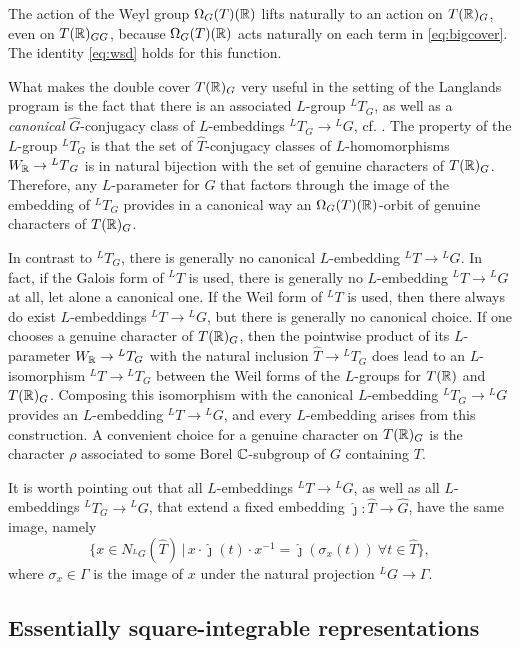 \documentclass{article}
\theoremstyle{definition}
\numberwithin{equation}{section}
\renewcommand{\-}{\hyp{}}
\begin{document}
The action of the Weyl group $\Omega_G(T)(\mathbb{R})$ lifts naturally to an action on $T(\mathbb{R})_G$, even on $T(\mathbb{R})_{GG}$, because $\Omega_G(T)(\mathbb{R})$ acts naturally on each term in \eqref{eq:bigcover}. The identity \eqref{eq:wsd} holds for this function.

What makes the double cover $T(\mathbb{R})_G$ very useful in the setting of the Langlands program is the fact that there is an associated $L$\-group $^LT_G$, as well as a \emph{canonical} $\hat G$-conjugacy class of $L$\-embeddings $^LT_G \to {^LG}$, cf. \cite[\S4.1]{KalDC}. The property of the $L$\-group $^LT_G$ is that the set of $\hat T$-conjugacy classes of $L$\-homomorphisms $W_{\mathbb{R}} \to {^LT}_G$ is in natural bijection with the set of genuine characters of $T(\mathbb{R})_G$. Therefore, any $L$\-parameter for $G$ that factors through the image of the embedding of $^LT_G$ provides in a canonical way an $\Omega_G(T)(\mathbb{R})$-orbit of genuine characters of $T(\mathbb{R})_G$.

In contrast to $^LT_G$, there is generally no canonical $L$\-embedding $^LT \to {^LG}$. In fact, if the Galois form of $^LT$ is used, there is generally no $L$\-embedding $^LT \to {^LG}$ at all, let alone a canonical one. If the Weil form of $^LT$ is used, then there always do exist $L$\-embeddings $^LT \to {^LG}$, but there is generally no canonical choice. If one chooses a genuine character of $T(\mathbb{R})_G$, then the pointwise product of its $L$\-parameter $W_{\mathbb{R}} \to {^LT_G}$ with the natural inclusion $\hat T \to {^LT_G}$ does lead to an $L$\-isomorphism $^LT \to {^LT_G}$ between the Weil forms of the $L$\-groups for $T(\mathbb{R})$ and $T(\mathbb{R})_G$. Composing this isomorphism with the canonical $L$\-embedding $^LT_G \to {^LG}$ provides an $L$\-embedding $^LT \to {^LG}$, and every $L$\-embedding arises from this construction. A convenient choice for a genuine character on $T(\mathbb{R})_G$ is the character $\rho$ associated to some Borel $\mathbb{C}$-subgroup of $G$ containing $T$.

It is worth pointing out that all $L$\-embeddings $^LT \to {^LG}$, as well as all $L$\-embeddings $^LT_G \to {^LG}$, that extend a fixed embedding $\hat\jmath : \hat T \to \hat G$, have the same image, namely
\begin{equation} \label{eq:lembim}
\{x \in N_{^LG}(\hat T)\,|\, x\cdot\hat\jmath(t)\cdot x^{-1} = \hat\jmath(\sigma_x(t))\ \forall t \in \hat T\},
\end{equation}
where $\sigma_x \in \Gamma$ is the image of $x$ under the natural projection $^LG \to \Gamma$.


\subsection{Essentially square-integrable representations} \label{sub:essds}
\end{document}
